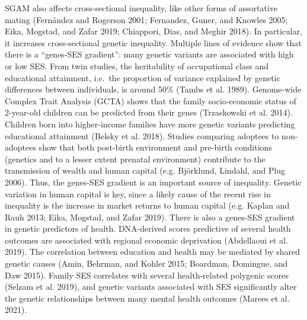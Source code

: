\documentclass[
  12pt,
]{article}
\theoremstyle{definition}
\theoremstyle{definition}
\theoremstyle{definition}
\theoremstyle{definition}
\theoremstyle{remark}
\begin{document}
SGAM also affects cross-sectional inequality, like other forms of assortative
mating (Fernández and Rogerson 2001; Fernandez, Guner, and Knowles 2005; Eika, Mogstad, and Zafar 2019; Chiappori, Dias, and Meghir 2018). In particular, it increases cross-sectional genetic
inequality. Multiple lines of evidence show that there is a
``genes-SES gradient'': many genetic variants are associated with high or low SES.
From twin studies, the heritability of occupational class and educational
attainment, i.e.~the proportion of variance explained by genetic differences
between individuals, is around 50\% (Tambs et al. 1989). Genome-wide Complex Trait
Analysis (GCTA) shows that the family socio-economic status of 2-year-old
children can be predicted from their genes (Trzaskowski et al. 2014). Children born
into higher-income families have more genetic variants predicting educational
attainment (Belsky et al. 2018). Studies comparing adoptees to non-adoptees show
that both post-birth environment and pre-birth conditions (genetics and to a
lesser extent prenatal environment) contribute to the transmission of wealth and
human capital (e.g. Björklund, Lindahl, and Plug 2006). Thus, the genes-SES gradient is an important source of
inequality. Genetic variation in human capital is key, since a likely cause of
the recent rise in inequality is the increase in market returns to human capital
(e.g. Kaplan and Rauh 2013; Eika, Mogstad, and Zafar 2019). There is also a genes-SES gradient in
genetic predictors of health. DNA-derived scores predictive of several health
outcomes are associated with regional economic deprivation
(Abdellaoui et al. 2019). The correlation between education and health
may be mediated by shared genetic causes (Amin, Behrman, and Kohler 2015; Boardman, Domingue, and Daw 2015). Family SES correlates with several health-related polygenic
scores (Selzam et al. 2019), and genetic variants associated with SES
significantly alter the genetic relationships between many mental health
outcomes (Marees et al. 2021).
\end{document}
